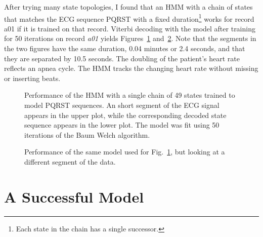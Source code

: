 \documentclass[12pt]{article}
\begin{document}
After trying many state topologies, I found that an HMM with a chain
of states that matches the ECG sequence PQRST with a fixed
duration\footnote{Each state in the chain has a single successor.}
works for record a01 if it is trained on that record.  Viterbi
decoding with the model after training for 50 iterations on record
\emph{a01} yields Figures~\ref{fig:dict_states_70}
and~\ref{fig:dict_states_71}.  Note that the segments in the two
figures have the same duration, 0.04 minutes or 2.4 seconds, and that
they are separated by 10.5 seconds.  The doubling of the patient's
heart rate reflects an apnea cycle.  The HMM tracks the changing heart
rate without missing or inserting beats.

\begin{figure}
  \centering
    \caption{Performance of the HMM with a single chain of 49 states
      trained to model PQRST sequences.  An short segment of the ECG
      signal appears in the upper plot, while the corresponding
      decoded state sequence appears in the lower plot.  The model was
      fit using 50 iterations of the Baum Welch algorithm.}
  \label{fig:dict_states_70}
\end{figure}

\begin{figure}
  \centering
  \caption{Performance of the same model used for
    Fig.~\ref{fig:dict_states_70}, but looking at a different
    segment of the data.}
  \label{fig:dict_states_71}
\end{figure}

\section{A Successful Model}
\label{sec:awkward}
\end{document}
